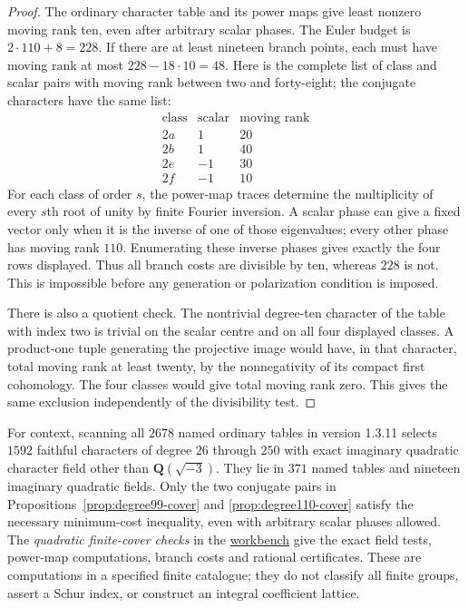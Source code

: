 \documentclass[11pt]{article}
\theoremstyle{definition}
\theoremstyle{remark}
\newcommand{\Q}{\mathbf Q}
\newcommand{\workbenchurl}{https://github.com/KokunoYumeto/algebraic-cycles-and-motives-workbench}
\begin{document}
\begin{proof}
The ordinary character table and its power maps give least nonzero
moving rank ten, even after arbitrary scalar phases.  The Euler
budget is $2\cdot110+8=228$.  If there are at least nineteen branch
points, each must have moving rank at most $228-18\cdot10=48$.
Here is the complete list of class and scalar pairs with moving
rank between two and forty-eight; the conjugate characters have the
same list:
\[
\begin{array}{c|r|r}
 \text{class}&\text{scalar}&\text{moving rank}\\\hline
 2a&1&20\\
 2b&1&40\\
 2e&-1&30\\
 2f&-1&10
\end{array}
\]
For each class of order $s$, the power-map traces determine the
multiplicity of every $s$th root of unity by finite Fourier inversion.
A scalar phase can give a fixed vector only when it is the inverse
of one of those eigenvalues; every other phase has moving rank
$110$.  Enumerating these inverse phases gives exactly the four
rows displayed.  Thus all branch costs are divisible by ten, whereas
$228$ is not.  This is impossible before any generation or
polarization condition is imposed.

There is also a quotient check.  The nontrivial degree-ten character
of the table with index two is trivial on the scalar centre and on
all four displayed classes.  A product-one tuple generating the
projective image would have, in that character, total moving rank
at least twenty, by the nonnegativity of its compact first cohomology.
The four classes would give total moving rank zero.  This gives
the same exclusion independently of the divisibility test.
\end{proof}

For context, scanning all $2678$ named ordinary tables in version
1.3.11 selects $1592$ faithful characters of degree $26$ through
$250$ with exact imaginary quadratic character field other than
$\Q(\sqrt{-3})$.  They lie in $371$ named tables and nineteen
imaginary quadratic fields.  Only the two conjugate pairs in
Propositions~\ref{prop:degree99-cover} and
\ref{prop:degree110-cover} satisfy the necessary minimum-cost
inequality, even with arbitrary scalar phases allowed.
The \emph{quadratic finite-cover checks} in the
\href{\workbenchurl}{workbench} give the exact field tests,
power-map computations, branch costs and rational certificates.
These are computations in a specified finite catalogue; they do
not classify all finite groups, assert a Schur index, or construct
an integral coefficient lattice.
\end{document}
